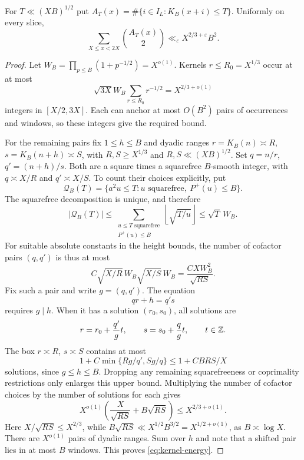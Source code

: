 \begin{lemma}\label{lem:kernel-energy}
For $T\ll(XB)^{1/2}$ put
$A_T(x)=\#\{i\in I_L:K_B(x+i)\le T\}$. Uniformly on every slice,
\begin{equation}\label{eq:kernel-energy}
 \sum_{X\le x<2X}\binom{A_T(x)}2\ll_\varepsilon X^{2/3+\varepsilon}B^2.
\end{equation}
\end{lemma}
\begin{proof}
Let $W_B=\prod_{p\le B}(1+p^{-1/2})=X^{o(1)}$.
Kernels $r\le R_0=X^{1/3}$ occur at at most
\[
 \sqrt{3X}W_B\sum_{r\le R_0}r^{-1/2}=X^{2/3+o(1)}
\]
integers in $[X/2,3X]$. Each can anchor at most $O(B^2)$ pairs of
occurrences and windows, so these integers give the required bound.

For the remaining pairs fix $1\le h\le B$ and dyadic ranges
$r=K_B(n)\asymp R$, $s=K_B(n+h)\asymp S$, with
$R,S\ge X^{1/3}$ and $R,S\ll(XB)^{1/2}$.
Set $q=n/r$, $q'=(n+h)/s$. Both are a square times a squarefree
$B$-smooth integer, with $q\asymp X/R$ and $q'\asymp X/S$.
To count their choices explicitly, put
\[
 \mathscr Q_B(T)=\{a^2u\le T:u\text{ squarefree},\ P^+(u)\le B\}.
\]
The squarefree decomposition is unique, and therefore
\[
 |\mathscr Q_B(T)|
 \le\sum_{\substack{u\le T\text{ squarefree}\\P^+(u)\le B}}
                       \left\lfloor\sqrt{T/u}\right\rfloor
 \le\sqrt T\,W_B.
\]
For suitable absolute constants in the height bounds, the number of
cofactor pairs $(q,q')$ is thus at most
\[
 C\sqrt{X/R}\,W_B\sqrt{X/S}\,W_B
       =\frac{CXW_B^2}{\sqrt{RS}}.
\]
Fix such a pair and write $g=(q,q')$. The equation
\[
 qr+h=q's
\]
requires $g\mid h$. When it has a solution $(r_0,s_0)$, all solutions are
\[
 r=r_0+\frac{q'}g t,\qquad s=s_0+\frac qg t,\qquad t\in\mathbb Z.
\]
The box $r\asymp R$, $s\asymp S$ contains at most
\[
 1+C\min\{Rg/q',Sg/q\}\le1+CBRS/X
\]
solutions, since $g\le h\le B$. Dropping any remaining squarefreeness
or coprimality restrictions only enlarges this upper bound. Multiplying
the number of cofactor choices by the number of solutions for each gives
\[
 X^{o(1)}\left(\frac{X}{\sqrt{RS}}+B\sqrt{RS}\right)
 \le X^{2/3+o(1)}.
\]
Here $X/\sqrt{RS}\le X^{2/3}$, while
$B\sqrt{RS}\ll X^{1/2}B^{3/2}=X^{1/2+o(1)}$, as $B\asymp\log X$.
There are $X^{o(1)}$ pairs of dyadic ranges. Sum over $h$ and note
that a shifted pair lies in at most $B$ windows. This proves
\eqref{eq:kernel-energy}.
\end{proof}

